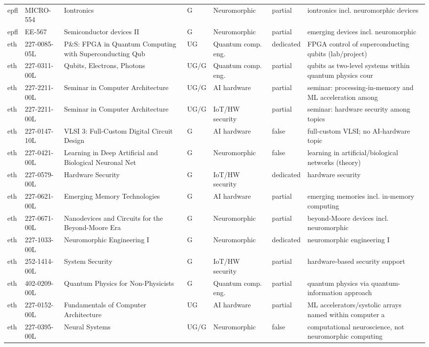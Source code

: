\documentclass[10pt]{article}
\begin{document}
\begin{longtable}{@{}llL{4.6cm}llll@{}}
epfl & MICRO-554 & Iontronics & G & Neuromorphic & partial & iontronics incl. neuromorphic devices \\
epfl & EE-567 & Semiconductor devices II & G & Neuromorphic & partial & emerging devices incl. neuromorphic \\
eth & 227-0085-05L & P\&S: FPGA in Quantum Computing with Superconducting Qub & UG & Quantum comp. eng. & dedicated & FPGA control of superconducting qubits (lab/project) \\
eth & 227-0311-00L & Qubits, Electrons, Photons & UG/G & Quantum comp. eng. & partial & qubits as two-level systems within quantum physics cour \\
eth & 227-2211-00L & Seminar in Computer Architecture & UG/G & AI hardware & partial & seminar: processing-in-memory and ML acceleration among \\
eth & 227-2211-00L & Seminar in Computer Architecture & UG/G & IoT/HW security & partial & seminar: hardware security among topics \\
eth & 227-0147-10L & VLSI 3: Full-Custom Digital Circuit Design & G & AI hardware & false & full-custom VLSI; no AI-hardware topic \\
eth & 227-0421-00L & Learning in Deep Artificial and Biological Neuronal Net & G & Neuromorphic & false & learning in artificial/biological networks (theory) \\
eth & 227-0579-00L & Hardware Security & G & IoT/HW security & dedicated & hardware security \\
eth & 227-0621-00L & Emerging Memory Technologies & G & AI hardware & partial & emerging memories incl. in-memory computing \\
eth & 227-0671-00L & Nanodevices and Circuits for the Beyond-Moore Era & G & Neuromorphic & partial & beyond-Moore devices incl. neuromorphic \\
eth & 227-1033-00L & Neuromorphic Engineering I & G & Neuromorphic & dedicated & neuromorphic engineering I \\
eth & 252-1414-00L & System Security & G & IoT/HW security & partial & hardware-based security support \\
eth & 402-0209-00L & Quantum Physics for Non-Physicists & G & Quantum comp. eng. & partial & quantum physics via quantum-information approach \\
eth & 227-0152-00L & Fundamentals of Computer Architecture & UG & AI hardware & partial & ML accelerators/systolic arrays named within computer a \\
eth & 227-0395-00L & Neural Systems & UG/G & Neuromorphic & false & computational neuroscience, not neuromorphic computing \\

\end{longtable}
\end{document}
